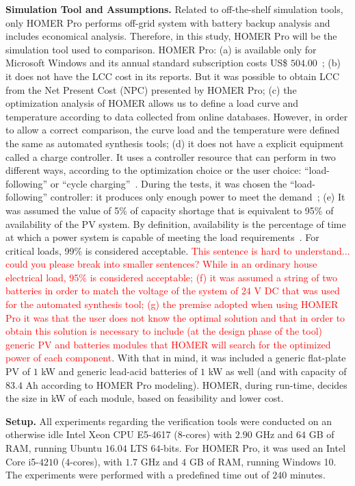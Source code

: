 \documentclass[runningheads]{llncs}
\begin{document}
\noindent \textbf{Simulation Tool and Assumptions.} Related to off-the-shelf simulation tools, only HOMER Pro performs off-grid system with battery backup analysis and includes economical analysis. Therefore, in this study, HOMER Pro will be the simulation tool used to comparison. HOMER Pro: (a) is available only for Microsoft Windows and its annual standard subscription costs US\$ $504.00$~\cite{HOMER}; (b) it does not have the LCC cost in its reports. But it was possible to obtain LCC from the Net Present Cost (NPC) presented by HOMER Pro; (c) the optimization analysis of HOMER allows us to define a load curve and temperature according to data collected from online databases. However, in order to allow a correct comparison, the curve load and the temperature were defined the same as automated synthesis tools; (d) it does not have a explicit equipment called a charge controller. It uses a controller resource that can perform in two different ways, according to the optimization choice or the user choice: ``load-following'' or ``cycle charging''~\cite{HOMER}. During the tests, it was chosen the ``load-following'' controller: it produces only enough power to meet the demand~\cite{HOMER}; (e) It was assumed the value of 5\% of capacity shortage that is equivalent to 95\% of availability of the PV system. By definition, availability is the percentage of time at which a power system is capable of meeting the load requirements~\cite{Khatib2014}. For critical loads, 99\% is considered acceptable. \textcolor{red}{This sentence is hard to understand... could you please break into smaller sentences? While in an ordinary house electrical load, 95\% is considered acceptable; (f) it was assumed a string of two batteries in order to match the voltage of the system of $24$ V DC that was used for the automated synthesis tool; (g) the premise adopted when using HOMER Pro it was that the user does not know the optimal solution and that in order to obtain this solution is necessary to include (at the design phase of the tool) generic PV and batteries modules that HOMER will search for the optimized power of each component}. With that in mind, it was included a generic flat-plate PV of $1$ kW and generic lead-acid batteries of $1$ kW as well (and with capacity of $83.4$ Ah according to HOMER Pro modeling). HOMER, during run-time, decides the size in kW of each module, based on feasibility and lower cost.

\noindent \textbf{Setup.} All experiments regarding the verification tools were conducted on an otherwise idle Intel Xeon CPU E5-4617 ($8$-cores) with $2.90$ GHz and $64$ GB of RAM, running Ubuntu $16.04$ LTS $64$-bits. For HOMER Pro, it was used an Intel Core i5-$4210$ ($4$-cores), with $1.7$ GHz and $4$ GB of RAM, running Windows 10. The experiments were performed with a predefined time out of $240$ minutes.
\end{document}
